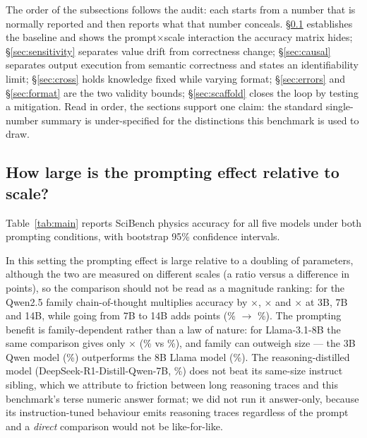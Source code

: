 \documentclass[10pt,letterpaper]{article}
\begin{document}
The order of the subsections follows the audit: each starts from a number that is
normally reported and then reports what that number conceals.
\S\ref{sec:main} establishes the baseline and shows the prompt$\times$scale
interaction the accuracy matrix hides; \S\ref{sec:sensitivity} separates value drift
from correctness change; \S\ref{sec:causal} separates output execution from semantic
correctness and states an identifiability limit; \S\ref{sec:cross} holds knowledge
fixed while varying format; \S\ref{sec:errors} and \S\ref{sec:format} are the two
validity bounds; \S\ref{sec:scaffold} closes the loop by testing a mitigation. Read
in order, the sections support one claim: the standard single-number summary is
under-specified for the distinctions this benchmark is used to draw.

\subsection{How large is the prompting effect relative to scale?}
\label{sec:main}
Table~\ref{tab:main} reports SciBench physics accuracy for all five models under
both prompting conditions, with bootstrap 95\% confidence intervals.



In this setting the prompting effect is large relative to a doubling of parameters,
although the two are measured on different scales (a ratio versus a difference in
points), so the comparison should not be read as a magnitude ranking: for the
Qwen2.5 family chain-of-thought multiplies accuracy by \ratioThreeB$\times$,
\ratioSevenB$\times$ and \ratioFourteenB$\times$ at 3B, 7B and 14B, while going
from 7B to 14B adds \gapFourteenVsSevenCot{} points
(\accCotSevenB\% $\rightarrow$ \accCotFourteenB\%). The prompting benefit is
family-dependent rather than a law of nature: for Llama-3.1-8B the same comparison
gives only \ratioLlamaEightB$\times$ (\accCotLlamaEightB\% vs
\accDirLlamaEightB\%), and family can outweigh size --- the 3B Qwen model
(\accCotThreeB\%) outperforms the 8B Llama model (\accCotLlamaEightB\%). The
reasoning-distilled model (DeepSeek-R1-Distill-Qwen-7B, \accCotROneSevenB\%) does
not beat its same-size instruct sibling, which we attribute to friction between
long reasoning traces and this benchmark's terse numeric answer format; we did not
run it answer-only, because its instruction-tuned behaviour emits reasoning traces
regardless of the prompt and a \emph{direct} comparison would not be
like-for-like.
\end{document}
